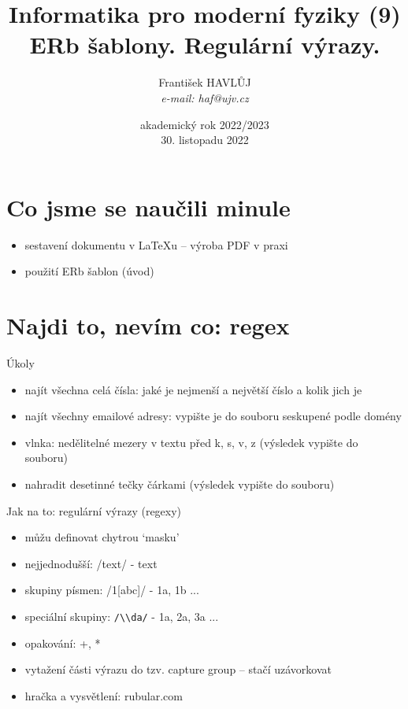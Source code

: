 \documentclass{beamer}
\title[IMF (9)]{Informatika pro moderní fyziky (9)\\ERb šablony. Regulární výrazy.}
\author[Franti\v{s}ek HAVL\r{U}J, ORF ÚJV Řež]{Franti\v{s}ek HAVL\r{U}J\\{\scriptsize \emph{e-mail: haf@ujv.cz}}}
\date{akademický rok 2022/2023\\30. listopadu 2022}
\institute[ORF ÚJV Řež]
{ÚJV Řež\\oddělení Reaktorové fyziky a podpory palivového cyklu}
\begin{document}
\begin{frame}
  \titlepage
\end{frame}

\begin{frame}
  \tableofcontents
\end{frame}

\section{Co jsme se naučili minule}

\begin{frame}{}
  \begin{itemize}
    \item sestavení dokumentu v LaTeXu -- výroba PDF v praxi
    \item použití ERb šablon (úvod)
  \end{itemize}
\end{frame}

\section{Najdi to, nevím co: regex}

\begin{frame}{Úkoly}
  \begin{itemize}
    \item najít všechna celá čísla: jaké je nejmenší a největší číslo a kolik jich je
    \item najít všechny emailové adresy: vypište je do souboru seskupené podle domény
    \item vlnka: nedělitelné mezery v textu před k, s, v, z (výsledek vypište do souboru)
    \item nahradit desetinné tečky čárkami (výsledek vypište do souboru)
  \end{itemize}
\end{frame}

\begin{frame}[fragile]{Jak na to: regulární výrazy (regexy)}
  \begin{itemize}
    \item můžu definovat chytrou `masku'
    \item nejjednodušší: /text/ - text
    \item skupiny písmen: /1[abc]/ - 1a, 1b ...
    \item speciální skupiny: \verb!/\\da/! - 1a, 2a, 3a ...
    \item opakování: +, *
    \item vytažení části výrazu do tzv. capture group -- stačí uzávorkovat
    \item hračka a vysvětlení: rubular.com
  \end{itemize}
\end{frame}
\end{document}
